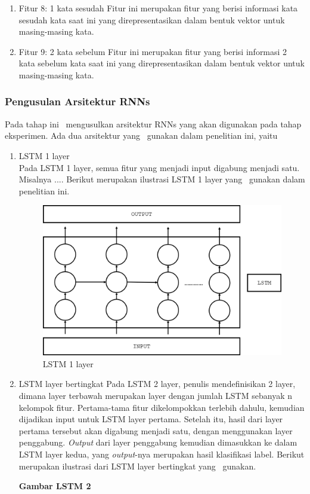 \begin{enumerate}
		 \item Fitur 8: 1 kata sesudah
		 Fitur ini merupakan fitur yang berisi informasi kata sesudah kata saat ini yang direpresentasikan dalam bentuk vektor untuk masing-masing kata.
		 
		 \item Fitur 9: 2 kata sebelum
		 Fitur ini merupakan fitur yang berisi informasi 2 kata sebelum kata saat ini yang direpresentasikan dalam bentuk vektor untuk masing-masing kata.
		 
	\end{enumerate}

	\subsubsection{Pengusulan Arsitektur RNNs}
	Pada tahap ini \saya~mengusulkan arsitektur RNNs yang akan digunakan pada tahap eksperimen. Ada dua arsitektur yang \saya~gunakan dalam penelitian ini, yaitu
	\begin{enumerate}
		\item LSTM 1 layer\\
		Pada LSTM 1 layer, semua fitur yang menjadi input digabung menjadi satu. Misalnya .... Berikut merupakan ilustrasi LSTM 1 layer yang \saya~gunakan dalam penelitian ini.
		
		\begin{figure}
			\centering
			\includegraphics[width=0.8\linewidth]{images/single_layer_rnn}
			\caption{LSTM 1 layer}
			\label{fig:single_layer_rnn}
		\end{figure}
	
		\item LSTM layer bertingkat
		Pada LSTM 2 layer, penulis mendefinisikan 2 layer, dimana layer terbawah merupakan layer dengan jumlah LSTM sebanyak n kelompok fitur. Pertama-tama fitur dikelompokkan terlebih dahulu, kemudian dijadikan input untuk LSTM layer pertama. Setelah itu, hasil dari layer pertama tersebut akan digabung menjadi satu, dengan menggunakan layer penggabung. \textit{Output} dari layer penggabung kemudian dimasukkan ke dalam LSTM layer kedua, yang \textit{output}-nya merupakan hasil klasifikasi label. Berikut merupakan ilustrasi dari LSTM layer bertingkat yang \saya~gunakan.
		
		\textbf{Gambar LSTM 2}
		
	\end{enumerate}
	
